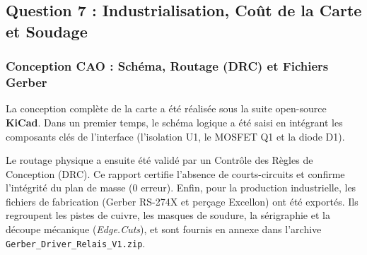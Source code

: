 \documentclass[11pt,a4paper]{article}
\begin{document}
\begin{table}[H]
    \centering
    \renewcommand{\arraystretch}{1.3}
    \caption{Caractéristiques et justification de l'optocoupleur retenu}
    \label{tab:choix_opto}
\end{table}

\subsection{Question 7 : Industrialisation, Coût de la Carte et Soudage}

\subsubsection{Conception CAO : Schéma, Routage (DRC) et Fichiers Gerber}

La conception complète de la carte a été réalisée sous la suite open-source \textbf{KiCad}. Dans un premier temps, le schéma logique a été saisi en intégrant les composants clés de l'interface (l'isolation U1, le MOSFET Q1 et la diode D1). 

Le routage physique a ensuite été validé par un Contrôle des Règles de Conception (DRC). Ce rapport certifie l'absence de courts-circuits et confirme l'intégrité du plan de masse (0 erreur). Enfin, pour la production industrielle, les fichiers de fabrication (Gerber RS-274X et perçage Excellon) ont été exportés. Ils regroupent les pistes de cuivre, les masques de soudure, la sérigraphie et la découpe mécanique (\textit{Edge.Cuts}), et sont fournis en annexe dans l'archive \texttt{Gerber\_Driver\_Relais\_V1.zip}.
\end{document}
